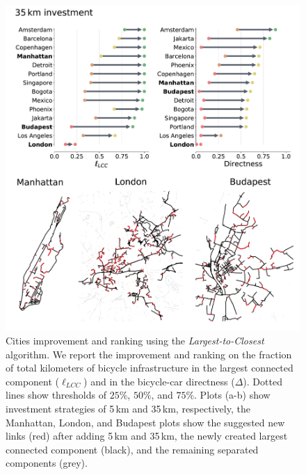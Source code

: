 \begin{figure}[htp!]
  \centering
  \includegraphics[width=\textwidth]{images/datadriven/35km.png}
  \caption[Cities bicycle connectivity improvement 35 new kilometers]{Cities improvement and ranking using the \emph{Largest-to-Closest} algorithm. We report the improvement and ranking on the fraction of total kilometers of bicycle infrastructure in the largest connected component ($\ell_{LCC}$) and in the bicycle-car directness ($\Delta$). Dotted lines show thresholds of $25\%$, $50\%$, and $75\%$. Plots (a-b) show investment strategies of 5\,km and 35\,km, respectively, the Manhattan, London, and Budapest plots show the suggested new links (red) after adding 5\,km and 35\,km, the newly created largest connected component (black), and the remaining separated components (grey).}
  \label{fig:Improvement35}
\end{figure}


